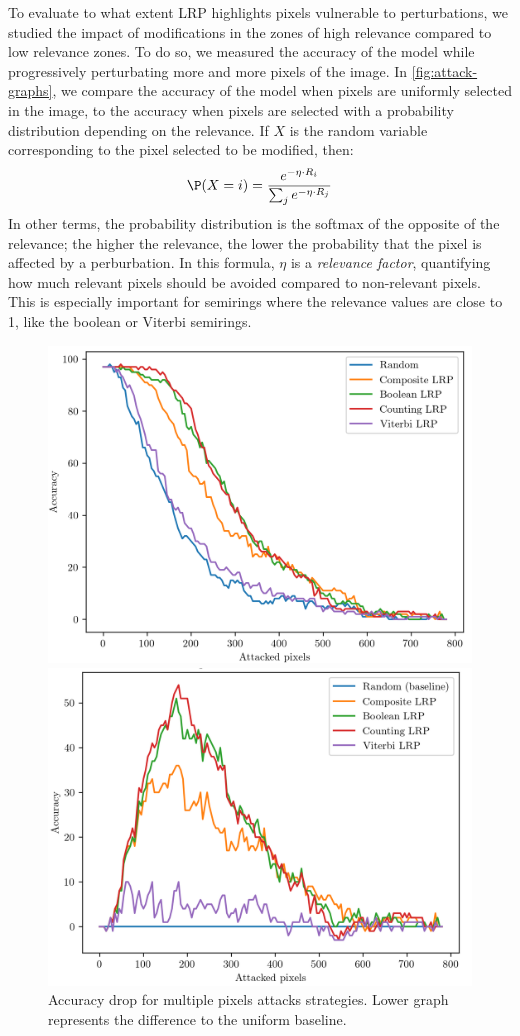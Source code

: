 \documentclass[twocolumn]{../cs-classes/cs-classes}
\newcommand*{\1}{\digitsbb{1}}
\newcommand*{\0}{\digitsbb{0}}
\begin{document}
To evaluate to what extent LRP highlights pixels vulnerable to perturbations, we studied the impact of modifications in the zones of high relevance compared to low relevance zones. To do so, we measured the accuracy of the model while progressively perturbating more and more pixels of the image. In \autoref{fig:attack-graphs}, we compare the accuracy of the model when pixels are uniformly selected in the image, to the accuracy when pixels are selected with a probability distribution depending on the relevance. If $X$ is the random variable corresponding to the pixel selected to be modified, then:
\begin{equation}
    \P(X=i) = \frac{e^{-\eta\cdot R_i}}{\sum_je^{-\eta\cdot R_j}}
\end{equation}
In other terms, the probability distribution is the softmax of the opposite of the relevance; the higher the relevance, the lower the probability that the pixel is affected by a perburbation.
In this formula, $\eta$ is a \emph{relevance factor}, quantifying how much relevant pixels should be avoided compared to non-relevant pixels. This is especially important for semirings where the relevance values are close to 1, like the boolean or Viterbi semirings.
\begin{figure}[H]
    \includegraphics[width=.9\linewidth]{attack-graph-1.png}
    
    \includegraphics[width=.9\linewidth]{attack-graph-2.png}
    \caption{Accuracy drop for multiple pixels attacks strategies. Lower graph represents the difference to the uniform baseline.}
    \label{fig:attack-graphs}
\end{figure}
\end{document}
